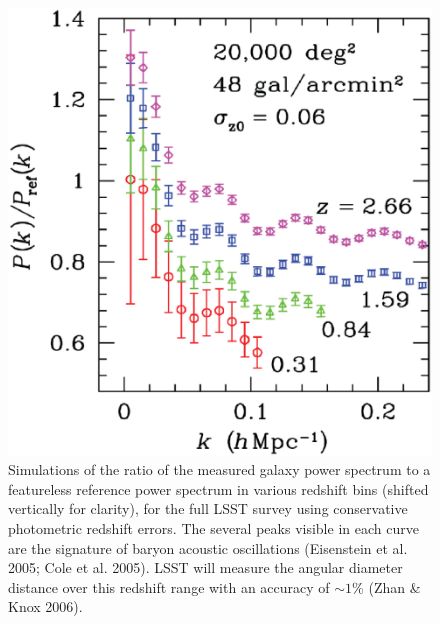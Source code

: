 \documentclass{emulateapj}
\begin{document}
\begin{figure}
\includegraphics[width=1.0\hsize,clip]{bao.ps}
\caption{Simulations of the ratio of the measured galaxy power spectrum to 
a featureless reference power spectrum in various redshift bins (shifted vertically 
for clarity), for the full LSST survey using conservative photometric redshift
errors. The several peaks visible in each curve are the signature of baryon acoustic 
oscillations (Eisenstein et al. 2005; Cole et al. 2005). LSST will measure the 
angular diameter distance over this redshift range with an accuracy of $\sim1$\% 
(Zhan \& Knox 2006).} 
\label{Fig:bao}
\end{figure}
\end{document}
